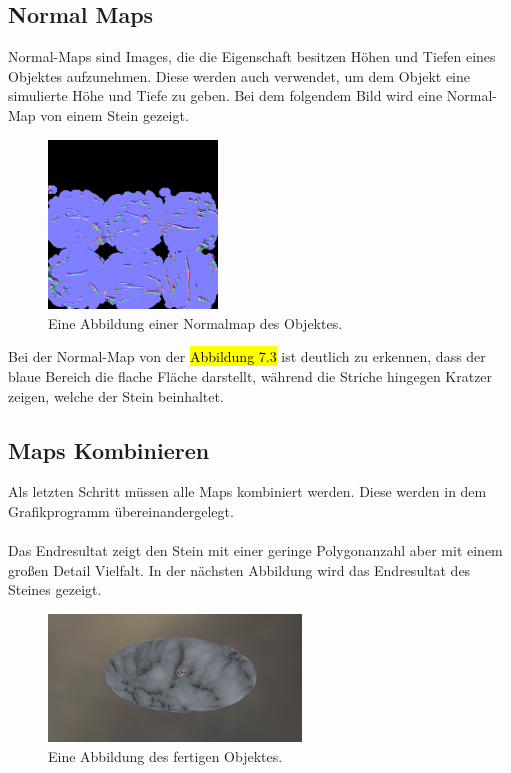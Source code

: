 \subsection{Normal Maps}

Normal-Maps sind Images, die die Eigenschaft besitzen Höhen und Tiefen eines Objektes aufzunehmen. Diese werden auch verwendet, um dem Objekt eine simulierte Höhe und Tiefe zu geben. Bei dem folgendem Bild wird eine Normal-Map von einem Stein gezeigt.

\begin{figure}[H]
    \centering
    \includegraphics[width=0.4\textwidth]{chapters/11/Images/SteinNormal.png}
    \caption{Eine Abbildung einer Normalmap des Objektes.}
    \label{htl01}
\end{figure}

\noindent Bei der Normal-Map von der \hl{Abbildung 7.3} ist deutlich zu erkennen, dass der blaue Bereich die flache Fläche darstellt, während die Striche hingegen Kratzer zeigen, welche der Stein beinhaltet.

\subsection{Maps Kombinieren}

Als letzten Schritt müssen alle Maps kombiniert werden. Diese werden in dem Grafikprogramm übereinandergelegt.\\\\
Das Endresultat zeigt den Stein mit einer geringe Polygonanzahl aber mit einem großen Detail Vielfalt. In der nächsten Abbildung wird das Endresultat des Steines gezeigt.

\begin{figure}[H]
    \centering
    \includegraphics[width=0.6\textwidth]{chapters/11/Images/SteinCombi.png}
    \caption{Eine Abbildung des fertigen Objektes.}
    \label{htl01}
\end{figure}

